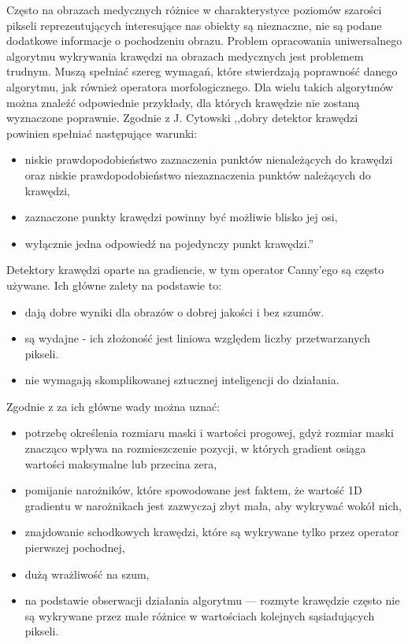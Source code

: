 \documentclass[a4paper,11pt,twoside,openright]{report}
\theoremstyle{definition}
\begin{document}
Często na obrazach medycznych różnice w charakterystyce poziomów szarości pikseli
reprezentujących interesujące nas obiekty są nieznaczne, nie są podane dodatkowe informacje
o pochodzeniu obrazu. Problem opracowania uniwersalnego algorytmu wykrywania krawędzi
na obrazach medycznych jest problemem trudnym. Muszą spełniać szereg wymagań,
które stwierdzają poprawność danego algorytmu, jak również operatora morfologicznego.
Dla wielu takich algorytmów można znaleźć odpowiednie przykłady,
dla których krawędzie nie zostaną wyznaczone poprawnie. Zgodnie z J. Cytowski \cite{Cyfrowe przetwarzanie
obrazów medycznych} ,,dobry detektor krawędzi powinien spełniać następujące warunki:
\begin{itemize}[noitemsep]
\item {niskie prawdopodobieństwo zaznaczenia punktów nienależących do krawędzi
oraz niskie prawdopodobieństwo niezaznaczenia punktów należących do krawędzi,}
\item {zaznaczone punkty krawędzi powinny być możliwie blisko jej osi,}
\item {wyłącznie jedna odpowiedź na pojedynczy punkt krawędzi.''}
\end{itemize}

Detektory krawędzi oparte na gradiencie, w tym operator Canny'ego są często używane.
Ich główne zalety na podstawie \cite{Cyfrowe przetwarzanie obrazów medycznych} to:
\begin{itemize}[noitemsep]
\item dają dobre wyniki dla obrazów o dobrej jakości i bez szumów.
\item są wydajne - ich złożoność jest liniowa względem liczby przetwarzanych pikseli.
\item nie wymagają skomplikowanej sztucznej inteligencji do działania.
\end{itemize}

Zgodnie z \cite{Cyfrowe przetwarzanie obrazów medycznych} za ich główne wady można uznać:
\begin{itemize}[noitemsep]
\item potrzebę określenia rozmiaru maski i wartości progowej, gdyż rozmiar maski
znacząco wpływa na rozmieszczenie pozycji, w których gradient osiąga wartości
maksymalne lub przecina zera,
\item pomijanie narożników, które spowodowane jest faktem, że wartość 1D gradientu
w narożnikach jest zazwyczaj zbyt mała, aby wykrywać wokół nich,
\item znajdowanie schodkowych krawędzi, które są wykrywane tylko przez operator pierwszej pochodnej,
\item dużą wrażliwość na szum,
\item na podstawie obserwacji działania algorytmu --- rozmyte krawędzie często
nie są wykrywane przez małe różnice w wartościach kolejnych sąsiadujących pikseli.
\end{itemize}
\end{document}
